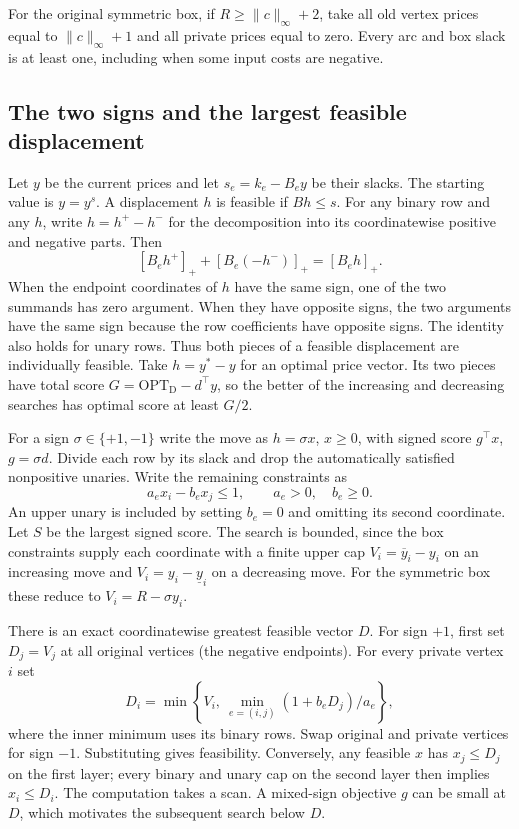 \documentclass[11pt,letterpaper]{article}
\begin{document}
For the original symmetric box, if $R\ge \|c\|_\infty+2$, take all old vertex prices equal to $\|c\|_\infty+1$ and all private prices equal to zero. Every arc and box slack is at least one, including when some input costs are negative.

\subsection{The two signs and the largest feasible displacement}

Let $y$ be the current prices and let $s_e=k_e-B_e y$ be their slacks. The starting value is $y=y^s$. A displacement $h$ is feasible if $Bh\le s$. For any binary row and any $h$, write $h=h^+-h^-$ for the decomposition into its coordinatewise positive and negative parts. Then
\[
 [B_e h^+]_+ + [B_e(-h^-)]_+=[B_e h]_+.
\]
When the endpoint coordinates of $h$ have the same sign, one of the two summands has zero argument. When they have opposite signs, the two arguments have the same sign because the row coefficients have opposite signs. The identity also holds for unary rows. Thus both pieces of a feasible displacement are individually feasible. Take $h=y^*-y$ for an optimal price vector. Its two pieces have total score $G=\mathrm{OPT}_{\mathrm D}-d^\top y$, so the better of the increasing and decreasing searches has optimal score at least $G/2$.

For a sign $\sigma\in\{+1,-1\}$ write the move as $h=\sigma x$, $x\ge0$, with signed score $g^\top x$, $g=\sigma d$. Divide each row by its slack and drop the automatically satisfied nonpositive unaries. Write the remaining constraints as
\begin{equation}\label{eq:signed-move}
 a_e x_i-b_e x_j\le1,\qquad a_e>0,\quad b_e\ge0.
\end{equation}
An upper unary is included by setting $b_e=0$ and omitting its second coordinate. Let $S$ be the largest signed score. The search is bounded, since the box constraints supply each coordinate with a finite upper cap $V_i=\overline y_i-y_i$ on an increasing move and $V_i=y_i-\underline y_i$ on a decreasing move. For the symmetric box these reduce to $V_i=R-\sigma y_i$.

There is an exact coordinatewise greatest feasible vector $D$. For sign $+1$, first set $D_j=V_j$ at all original vertices (the negative endpoints). For every private vertex $i$ set
\[
 D_i=\min\left\{V_i,\ \min_{e=(i,j)}(1+b_eD_j)/a_e\right\},
\]
where the inner minimum uses its binary rows. Swap original and private vertices for sign $-1$. Substituting gives feasibility. Conversely, any feasible $x$ has $x_j\le D_j$ on the first layer; every binary and unary cap on the second layer then implies $x_i\le D_i$. The computation takes a scan. A mixed-sign objective $g$ can be small at $D$, which motivates the subsequent search below $D$.
\end{document}
